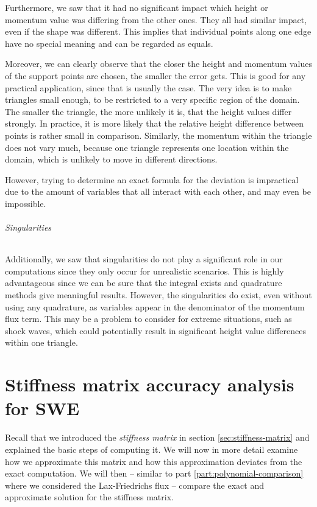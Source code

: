 \documentclass[a4paper, twoside]{article}
\begin{document}
Furthermore, we saw that it had no significant impact which height or momentum value was differing from the other ones.
They all had similar impact, even if the shape was different.
This implies that individual points along one edge have no special meaning and can be regarded as equals.

Moreover, we can clearly observe that the closer the height and momentum values of the support points are chosen, the smaller the error gets.
This is good for any practical application, since that is usually the case.
The very idea is to make triangles small enough, to be restricted to a very specific region of the domain.
The smaller the triangle, the more unlikely it is, that the height values differ strongly.
In practice, it is more likely that the relative height difference between points is rather small in comparison. Similarly, the momentum within the triangle does not vary much, because one triangle represents one location within the domain, which is unlikely to move in different directions.

However, trying to determine an exact formula for the deviation is impractical due to the amount of variables that all interact with each other, and may even be impossible.

\paragraph{Singularities}

Additionally, we saw that singularities do not play a significant role in our computations since they only occur for unrealistic scenarios.
This is highly advantageous since we can be sure that the integral exists and quadrature methods give meaningful results.
However, the singularities do exist, even without using any quadrature, as variables appear in the denominator of the momentum flux term.
This may be a problem to consider for extreme situations, such as shock waves, which could potentially result in significant height value differences within one triangle.

\clearpage{}

\part{Stiffness matrix accuracy analysis for SWE}
\label{part:stiffness-matrix}

Recall that we introduced the \emph{stiffness matrix} in section \ref{sec:stiffness-matrix} and explained the basic steps of computing it. We will now in more detail examine how we approximate this matrix and how this approximation deviates from the exact computation. We will then -- similar to part \ref{part:polynomial-comparison} where we considered the Lax-Friedrichs flux -- compare the exact and approximate solution for the stiffness matrix.
\end{document}
